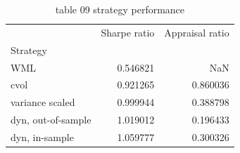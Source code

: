 \begin{table}[htbp]
  \centering
  \caption{table 09 strategy performance}
  \label{tab:table_09_strategy_performance}
  \begin{tabular}{lrr}
\toprule
 & Sharpe ratio & Appraisal ratio \\
Strategy &  &  \\
\midrule
WML & 0.546821 & NaN \\
cvol & 0.921265 & 0.860036 \\
variance scaled & 0.999944 & 0.388798 \\
dyn, out-of-sample & 1.019012 & 0.196433 \\
dyn, in-sample & 1.059777 & 0.300326 \\
\bottomrule
\end{tabular}

\end{table}
